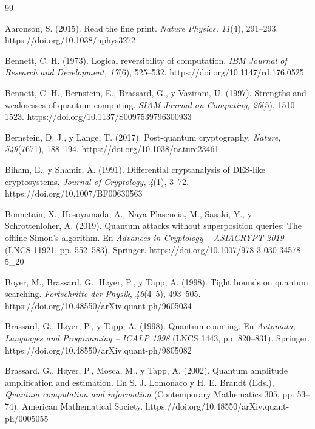 \begin{thebibliography}{99}

Aaronson, S. (2015). Read the fine print. \emph{Nature Physics, 11}(4), 291--293. https://doi.org/10.1038/nphys3272

Bennett, C. H. (1973). Logical reversibility of computation. \emph{IBM Journal of Research and Development, 17}(6), 525--532. https://doi.org/10.1147/rd.176.0525

Bennett, C. H., Bernstein, E., Brassard, G., y Vazirani, U. (1997). Strengths and weaknesses of quantum computing. \emph{SIAM Journal on Computing, 26}(5), 1510--1523. https://doi.org/10.1137/S0097539796300933

Bernstein, D. J., y Lange, T. (2017). Post-quantum cryptography. \emph{Nature, 549}(7671), 188--194. https://doi.org/10.1038/nature23461

Biham, E., y Shamir, A. (1991). Differential cryptanalysis of DES-like cryptosystems. \emph{Journal of Cryptology, 4}(1), 3--72. https://doi.org/10.1007/BF00630563

Bonnetain, X., Hosoyamada, A., Naya-Plasencia, M., Sasaki, Y., y Schrottenloher, A. (2019). Quantum attacks without superposition queries: The offline Simon's algorithm. En \emph{Advances in Cryptology -- ASIACRYPT 2019} (LNCS 11921, pp. 552--583). Springer. https://doi.org/10.1007/978-3-030-34578-5\_20

Boyer, M., Brassard, G., Høyer, P., y Tapp, A. (1998). Tight bounds on quantum searching. \emph{Fortschritte der Physik, 46}(4--5), 493--505. https://doi.org/10.48550/arXiv.quant-ph/9605034

Brassard, G., Høyer, P., y Tapp, A. (1998). Quantum counting. En \emph{Automata, Languages and Programming -- ICALP 1998} (LNCS 1443, pp. 820--831). Springer. https://doi.org/10.48550/arXiv.quant-ph/9805082

Brassard, G., Høyer, P., Mosca, M., y Tapp, A. (2002). Quantum amplitude amplification and estimation. En S. J. Lomonaco y H. E. Brandt (Eds.), \emph{Quantum computation and information} (Contemporary Mathematics 305, pp. 53--74). American Mathematical Society. https://doi.org/10.48550/arXiv.quant-ph/0005055


\end{thebibliography}
